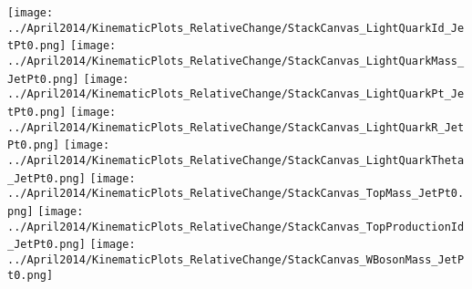 \begin{center}
\texttt{[image: ../April2014/KinematicPlots\_RelativeChange/StackCanvas\_LightQuarkId\_JetPt0.png]}
\texttt{[image: ../April2014/KinematicPlots\_RelativeChange/StackCanvas\_LightQuarkMass\_JetPt0.png]}
\texttt{[image: ../April2014/KinematicPlots\_RelativeChange/StackCanvas\_LightQuarkPt\_JetPt0.png]}
\texttt{[image: ../April2014/KinematicPlots\_RelativeChange/StackCanvas\_LightQuarkR\_JetPt0.png]}
\texttt{[image: ../April2014/KinematicPlots\_RelativeChange/StackCanvas\_LightQuarkTheta\_JetPt0.png]}
\texttt{[image: ../April2014/KinematicPlots\_RelativeChange/StackCanvas\_TopMass\_JetPt0.png]}
\texttt{[image: ../April2014/KinematicPlots\_RelativeChange/StackCanvas\_TopProductionId\_JetPt0.png]}
\texttt{[image: ../April2014/KinematicPlots\_RelativeChange/StackCanvas\_WBosonMass\_JetPt0.png]}
\end{center}

